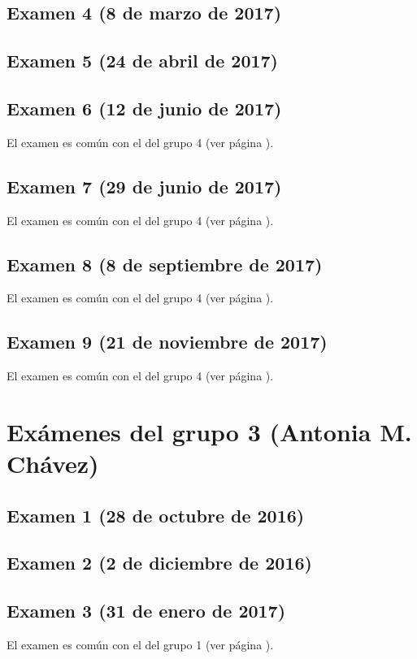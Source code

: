 \documentclass[a4paper,12pt,twoside]{book}
\begin{document}
\subsection{Examen 4 (8 de marzo de 2017)}
\subsection{Examen 5 (24 de abril de 2017)}
\subsection{Examen 6 (12 de junio de 2017)} 
El examen es común con el del grupo 4 (ver página \pageref{examen_16_17_4_6}).
\subsection{Examen 7 (29 de junio de 2017)}
El examen es común con el del grupo 4 (ver página \pageref{examen_16_17_4_7}).
\subsection{Examen 8 (8 de septiembre de 2017)}
El examen es común con el del grupo 4 (ver página \pageref{examen_16_17_4_8}).
\subsection{Examen 9 (21 de noviembre de 2017)}
El examen es común con el del grupo 4 (ver página \pageref{examen_16_17_4_9}).

\section{Exámenes del grupo 3 (Antonia M. Chávez)}
\subsection{Examen 1 (28 de octubre de 2016)}
\subsection{Examen 2 (2 de diciembre de 2016)}
\subsection{Examen 3 (31 de enero de 2017)}
El examen es común con el del grupo 1 (ver página \pageref{examen_16_17_1_3}).
\end{document}
